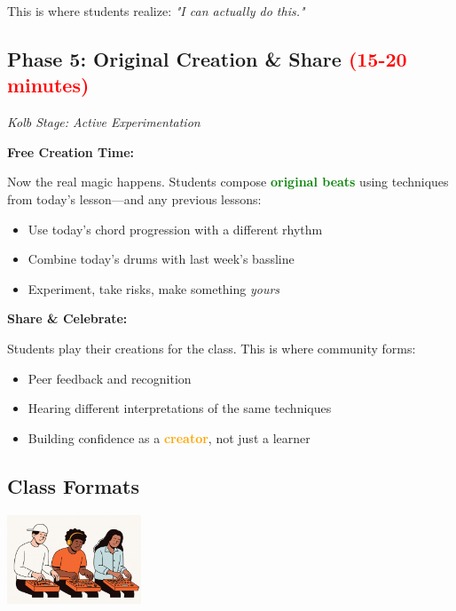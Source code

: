 \documentclass[11pt,letterpaper]{article}
\newcommand{\greentext}[1]{\textcolor{green}{\textbf{#1}}}
\newcommand{\orangetext}[1]{\textcolor{orange}{\textbf{#1}}}
\begin{document}
This is where students realize: \textit{"I can actually do this."}

\subsection*{Phase 5: Original Creation \& Share \texorpdfstring{\textcolor{red}{(15-20 minutes)}}{(15-20 minutes)}}
\textit{Kolb Stage: Active Experimentation}

\textbf{Free Creation Time:}

Now the real magic happens. Students compose \greentext{original beats} using techniques from today's lesson—and any previous lessons:

\begin{itemize}[leftmargin=*]
\item Use today's chord progression with a different rhythm
\item Combine today's drums with last week's bassline
\item Experiment, take risks, make something \textit{yours}
\end{itemize}

\textbf{Share \& Celebrate:}

Students play their creations for the class. This is where community forms:
\begin{itemize}[leftmargin=*]
\item Peer feedback and recognition
\item Hearing different interpretations of the same techniques
\item Building confidence as a \orangetext{creator}, not just a learner
\end{itemize}

\vspace{0.5cm}

\subsection*{Class Formats}

\begin{center}
\includegraphics[width=0.3\textwidth]{../../assets/images/illustrations/Band.png}
\end{center}
\end{document}
